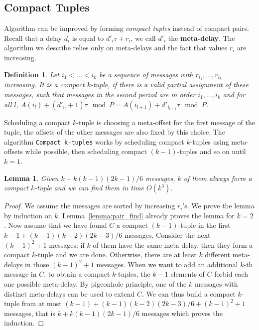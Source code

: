 \documentclass[pdflatex,sn-mathphys,iicol]{sn-jnl}%
\theoremstyle{thmstyleone}%
\newtheorem{lemma}[theorem]{Lemma}
\theoremstyle{thmstyletwo}%
\theoremstyle{thmstylethree}%
\newtheorem{definition}{Definition}%
\begin{document}
\subsection{Compact Tuples}\label{sec:compact}

Algorithm \compactpair can be improved by forming \emph{compact tuples} instead of compact pairs. Recall that a delay $d_i$ is equal to  $d'_i\tau + r_i$, we call $d'_i$ the \textbf{meta-delay}. The algorithm we describe relies only on meta-delays and the fact that values $r_i$ are increasing.

\begin{definition}
Let $i_1 < \dots < i_k$ be a sequence of messages with $r_{i_1},\dots,r_{i_k}$ increasing. 
It is a compact $k$-tuple, if there is a valid partial assignment of these messages, such that messages in the second period are in order $i_1,\dots,i_k$ and for all $l$, $A(i_l) + (d'_{i_l} + 1)\tau \mod P = A(i_{l+1}) + d'_{i_{l+1}}\tau \mod P$.
\end{definition}

 Scheduling a compact $k$-tuple is choosing a meta-offset for the first message of the tuple, the offsets of the other messages are also fixed by this choice. The algorithm \texttt{Compact k-tuples} works by scheduling compact $k$-tuples using meta-offsets while possible, then scheduling compact $(k-1)$-tuples and so on until $k=1$.
 


\begin{lemma}\label{lemma:uple_find}
Given $k + k(k-1)(2k-1)/6$ messages, $k$ of them always form a compact $k$-tuple and we can find them in time $O(k^3)$. 
\end{lemma}
\begin{proof}
We assume the messages are sorted by increasing $r_i$'s. We prove the lemma by induction on $k$. Lemma~\ref{lemma:pair_find} already proves the lemma for $k=2$.
Now assume that we have found $C$ a compact $(k-1)$-tuple in the first $k-1 + (k-1)(k-2)(2k-3)/6$ messages. Consider the next $(k-1)^2 + 1$ messages: if $k$ of them have the same meta-delay, then they form a compact $k$-tuple and we are done. Otherwise, there are at least $k$ different meta-delays in those $(k-1)^2 + 1$ messages. When we want to add an additional $k$-th message in $C$, to obtain a compact $k$-tuples, the $k-1$ elements of $C$ forbid each one possible meta-delay. By pigeonhole principle, one of the $k$ messages with distinct meta-delays can be used to extend $C$. We can thus build a compact $k$-tuple from at most $(k-1) + (k-1)(k-2)(2k-3)/6 + (k-1)^2 + 1$ messages, that is $k + k(k-1)(2k-1)/6$ messages which proves the induction.
\end{proof}
\end{document}
